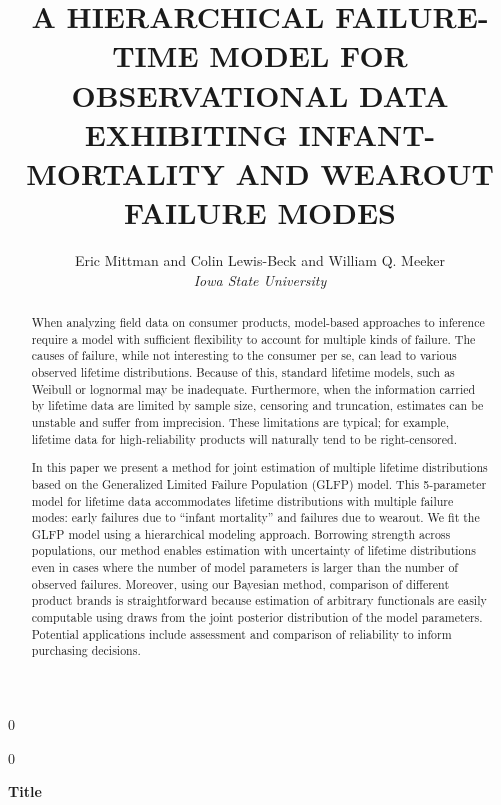 \documentclass[aap]{imsart}
\newcommand{\blind}{0}
\begin{document}
\def\spacingset#1{\renewcommand{\baselinestretch}%
{#1}\small\normalsize} \spacingset{1}



\blind
{
  \title{\bf A HIERARCHICAL FAILURE-TIME MODEL FOR OBSERVATIONAL DATA EXHIBITING INFANT-MORTALITY AND WEAROUT FAILURE MODES}
  \author{Eric Mittman and Colin Lewis-Beck and William Q. Meeker\\
	\textit{Iowa State University}}
  \maketitle
} \fi

\blind
{
  \bigskip
  \bigskip
  \bigskip
  \begin{center}
    {\LARGE\bf Title}
\end{center}
  \medskip
} \fi

\bigskip
\begin{abstract}
When analyzing field data on consumer products, model-based approaches to inference require a model with sufficient flexibility to account for multiple kinds of failure. The causes of failure, while not interesting to the consumer per se, can lead to various observed lifetime distributions. Because of this, standard lifetime models, such as Weibull or lognormal may be inadequate. 
Furthermore, when the information carried by lifetime data are limited by sample size, censoring and truncation, estimates can be unstable and suffer from imprecision. These limitations are typical; for example, lifetime data for high-reliability products will naturally tend to be right-censored.


In this paper we present a method for joint estimation of multiple lifetime distributions based on the Generalized Limited Failure Population (GLFP) model. This 5-parameter model for lifetime data accommodates lifetime distributions with multiple failure modes:  early failures due to ``infant mortality'' and failures due to wearout. We fit the GLFP model using a hierarchical modeling approach.  Borrowing strength across populations, our method enables estimation with uncertainty of lifetime distributions even in cases where the number of model parameters is larger than the number of observed failures.  Moreover, using our Bayesian method, comparison of different product brands is straightforward because estimation of arbitrary functionals are easily computable using draws from the joint posterior distribution of the model parameters. Potential applications include assessment and comparison of reliability to inform purchasing decisions.
\end{abstract}
\end{document}
